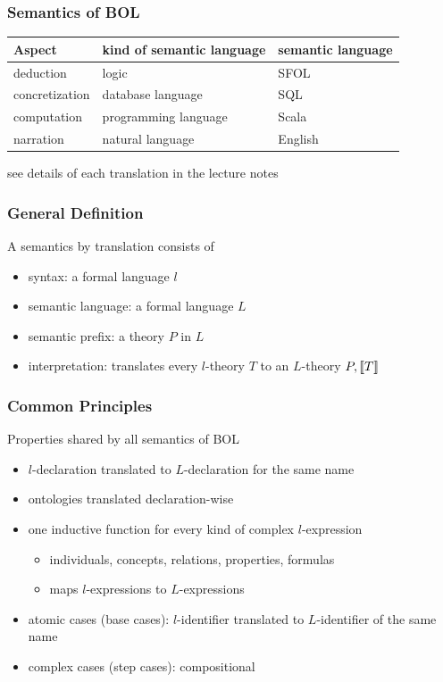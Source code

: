\begin{frame}\frametitle{Semantics of BOL}
\begin{center}
\begin{tabular}{lll}
Aspect & kind of semantic language & semantic language\\
\hline 
deduction & logic & SFOL \\
concretization & database language & SQL \\
computation & programming language & Scala \\
narration & natural language & English \\
\end{tabular}
\end{center}

see details of each translation in the lecture notes
\end{frame}

\begin{frame}\frametitle{General Definition}
A semantics by translation consists of
\begin{itemize}
 \item syntax: a formal language $l$
 \item semantic language: a formal language $L$
 \item semantic prefix: a theory $P$ in $L$
 \item interpretation: translates every $l$-theory $T$ to an $L$-theory $P,\llbracket T\rrbracket$
\end{itemize}
\end{frame}

\begin{frame}\frametitle{Common Principles}
Properties shared by all semantics of BOL
\begin{itemize}
 \item $l$-declaration translated to $L$-declaration for the same name
 \item ontologies translated declaration-wise
 \item one inductive function for every kind of complex $l$-expression
  \begin{itemize}
   \item individuals, concepts, relations, properties, formulas
   \item maps $l$-expressions to $L$-expressions
  \end{itemize}
 \item atomic cases (base cases): $l$-identifier translated to $L$-identifier of the same name
 \item complex cases (step cases): compositional
\end{itemize}
\end{frame}

